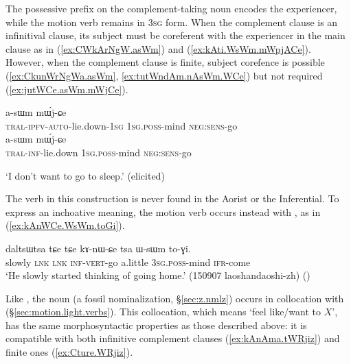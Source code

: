 The possessive prefix on the complement-taking noun encodes the experiencer, while the motion verb  remains in \textsc{3sg} form. When the complement clause is an infinitival clause, its subject must be coreferent with the experiencer in the main clause as in (\ref{ex:CWkArNgW.asWm}) and (\ref{ex:kAti.WsWm.mWpjACe}). However, when the complement clause is finite, subject corefence is possible (\ref{ex:CkunWrNgWa.asWm}, \ref{ex:tutWndAm.nAsWm.WCe}) but not required (\ref{ex:jutWCe.asWm.mWjCe}).

\begin{exe}
\ex 
\begin{xlist}
\ex  \label{ex:CkunWrNgWa.asWm}
\gll [ɕ-ku-nɯ-rŋgɯ-a] a-sɯm mɯ́j-ɕe \\
\textsc{tral}-\textsc{ipfv}-\textsc{auto}-lie.down-\textsc{1sg} \textsc{1sg}.\textsc{poss}-mind \textsc{neg}:\textsc{sens}-go \\
\ex  \label{ex:CWkArNgW.asWm}
\gll [ɕɯ-kɤ-rŋgɯ] a-sɯm mɯ́j-ɕe \\
\textsc{tral}-\textsc{inf}-lie.down \textsc{1sg}.\textsc{poss}-mind \textsc{neg}:\textsc{sens}-go \\
\end{xlist}
\glt `I don't want to go to sleep.' (elicited)
\end{exe}

The verb  in this construction is never found in the Aorist or the Inferential. To express an inchoative meaning, the motion verb  occurs instead with , as in (\ref{ex:kAnWCe.WsWm.toGi}).

\begin{exe}
\ex  \label{ex:kAnWCe.WsWm.toGi}
\gll daltsɯtsa tɕe tɕe kɤ-nɯ-ɕe tsa ɯ-sɯm to-ɣi.  \\
slowly \textsc{lnk} \textsc{lnk} \textsc{inf}-\textsc{vert}-go a.little \textsc{3sg}.\textsc{poss}-mind \textsc{ifr}-come \\
\glt `He slowly started thinking of going home.' (150907 laoshandaoshi-zh)
()
\end{exe}

Like , the noun  (a fossil  nominalization, §\ref{sec:z.nmlz}) occurs in collocation with  (§\ref{sec:motion.light.verbs}). This collocation, which means `feel like/want to $X$', has the same morphosyntactic properties as those described above: it is compatible with both infinitive complement clauses (\ref{ex:kAnAma.tWRjiz}) and finite ones (\ref{ex:Cture.WRjiz}).

